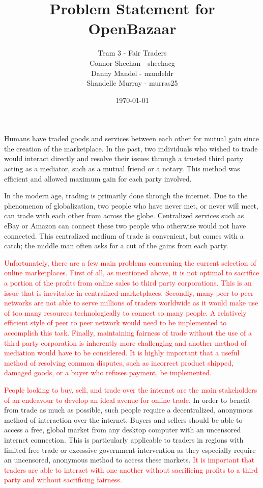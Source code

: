 \documentclass[12pt]{report}
\begin{document}
\title{Problem Statement for OpenBazaar} 
\author{Team 3 - Fair Traders \\ Connor Sheehan - sheehacg \\Danny Mandel - mandeldr \\ Shandelle Murray - murras25}
\date{\today}
	
\maketitle

Humans have traded goods and services between each other for mutual gain since the creation of the marketplace. In the past, two individuals who wished to trade would interact directly and resolve their issues through a trusted third party acting as a mediator, such as a mutual friend or a notary. This method was efficient and allowed maximum gain for each party involved. 
	
In the modern age, trading is primarily done through the internet. Due to the phenomenon of globalization, two people who have never met, or never will meet, can trade with each other from across the globe. Centralized services such as eBay or Amazon can connect these two people who otherwise would not have connected. This centralized medium of trade is convenient, but comes with a catch; the middle man often asks for a cut of the gains from each party. 

\textcolor{red}{
Unfortunately, there are a few main problems concerning the current selection of online marketplaces. First of all, as mentioned above, it is not optimal to sacrifice a portion of the profits from online sales to third party corporations. This is an issue that is inevitable in centralized marketplaces. Secondly, many peer to peer networks are not able to serve millions of traders worldwide as it would make use of too many resources technologically to connect so many people. A relatively efficient style of peer to peer network would need to be implemented to accomplish this task. Finally, maintaining fairness of trade without the use of a third party corporation is inherently more challenging and another method of mediation would have to be considered. It is highly important that a useful method of resolving common disputes, such as incorrect product shipped, damaged goods, or a buyer who refuses payment, be implemented.}

\textcolor{red}{People looking to buy, sell, and trade over the internet are the main stakeholders of an endeavour to develop an ideal avenue for online trade.} In order to benefit from trade as much as possible, such people require a decentralized, anonymous method of interaction over the internet. Buyers and sellers should be able to access a free, global market from any desktop computer with an uncensored internet connection. This is particularly applicable to traders in regions with limited free trade or excessive government intervention as they especially require an uncensored, anonymous method to access these markets. \textcolor{red}{It is important that traders are able to interact with one another without sacrificing profits to a third party and without sacrificing fairness.}
	
\end{document}

